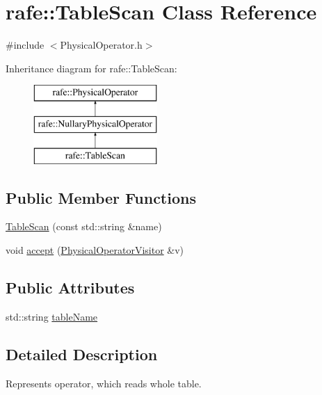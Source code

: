 \hypertarget{classrafe_1_1_table_scan}{\section{rafe\+:\+:Table\+Scan Class Reference}
\label{classrafe_1_1_table_scan}
}


{\ttfamily \#include $<$Physical\+Operator.\+h$>$}

Inheritance diagram for rafe\+:\+:Table\+Scan\+:\begin{figure}[H]
\begin{center}
\leavevmode
\includegraphics[height=3.000000cm]{classrafe_1_1_table_scan}
\end{center}
\end{figure}
\subsection*{Public Member Functions}
\begin{DoxyCompactItemize}
\item 
\hyperlink{classrafe_1_1_table_scan_a901990982dfd163e3154d6dfab40b6f8}{Table\+Scan} (const std\+::string \&name)
\item 
void \hyperlink{classrafe_1_1_table_scan_a87cd9f9b093f153bd95b39bc3ea18678}{accept} (\hyperlink{classrafe_1_1_physical_operator_visitor}{Physical\+Operator\+Visitor} \&v)
\end{DoxyCompactItemize}
\subsection*{Public Attributes}
\begin{DoxyCompactItemize}
\item 
std\+::string \hyperlink{classrafe_1_1_table_scan_a594b9df476c4abc0e74cc9ded1101978}{table\+Name}
\end{DoxyCompactItemize}


\subsection{Detailed Description}
Represents operator, which reads whole table. 

